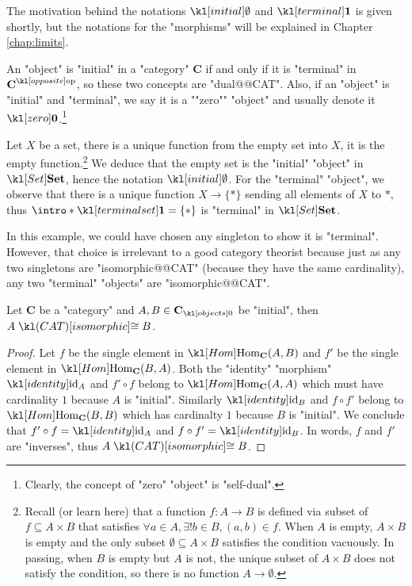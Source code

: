 \documentclass[main.tex]{subfiles}
\begin{document}
\begin{rem}[Notation]
	The motivation behind the notations $\initial$ and $\terminal$ is given shortly, but the notations for the "morphisms" will be explained in Chapter \ref{chap:limits}.
\end{rem}
An "object" is "initial" in a "category" $\mathbf{C}$ if and only if it is "terminal" in $\op{\mathbf{C}}$, so these two concepts are "dual@@CAT". \AP Also, if an "object" is "initial" and "terminal", we say it is a ""zero"" "object" and usually denote it $\zero$.\footnote{Clearly, the concept of "zero" "object" is "self-dual".}
\begin{exmp}[$\catSet$]
	Let $X$ be a set, there is a unique function from the empty set into $X$, it is the empty function.\footnote{Recall (or learn here) that a function $f: A \rightarrow B$ is defined via subset of $f \subseteq A \times B$ that satisfies $\forall a \in A, \exists! b\in B, (a,b) \in f$. When $A$ is empty, $A \times B$ is empty and the only subset $\emptyset \subseteq A\times B$ satisfies the condition vacuously. In passing, when $B$ is empty but $A$ is not, the unique subset of $A \times B$ does not satisfy the condition, so there is no function $A \rightarrow \emptyset$.} We deduce that the empty set is the "initial" "object" in $\catSet$, hence the notation $\initial$. \AP For the "terminal" "object", we observe that there is a unique function $X \rightarrow \{\ast\}$ sending all elements of $X$ to $\ast$, thus $\intro*\termset = \{\ast\}$ is "terminal" in $\catSet$.
\end{exmp}
In this example, we could have chosen any singleton to show it is "terminal". However, that choice is irrelevant to a good category theorist because just as any two singletons are "isomorphic@@CAT" (because they have the same cardinality), any two "terminal" "objects" are "isomorphic@@CAT".
\begin{prop}\label{prop:initialunique}
	Let $\mathbf{C}$ be a "category" and $A,B\in \obj{\mathbf{C}}$ be "initial", then $A \isoCAT B$.
\end{prop}
\begin{proof}
	Let $f$ be the single element in $\Hom_{\mathbf{C}}(A,B)$ and $f'$ be the single element in $\Hom_{\mathbf{C}}(B,A)$. Both the "identity" "morphism" $\id_A$ and $f' \circ f$ belong to $\Hom_{\mathbf{C}}(A,A)$ which must have cardinality $1$ because $A$ is "initial". Similarly $\id_B$ and $f \circ f'$ belong to $\Hom_{\mathbf{C}}(B,B)$ which has cardinalty $1$ because $B$ is "initial". We conclude that $f' \circ f = \id_A$ and $f\circ f' = \id_B$. In words, $f$ and $f'$ are "inverses", thus $A \isoCAT B$. 
\end{proof}
\end{document}
